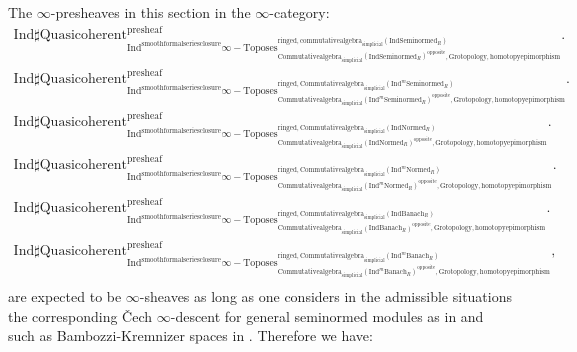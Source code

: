\documentclass[11pt]{book}
\theoremstyle{definition}
\numberwithin{equation}{section}
\begin{document}
\indent The $\infty$-presheaves in this section in the $\infty$-category:	
\begin{align}
\mathrm{Ind}\mathrm{\sharp Quasicoherent}^{\text{presheaf}}_{\mathrm{Ind}^\text{smoothformalseriesclosure}\infty-\mathrm{Toposes}^{\mathrm{ringed},\mathrm{commutativealgebra}_{\mathrm{simplicial}}(\mathrm{Ind}\mathrm{Seminormed}_R)}_{\mathrm{Commutativealgebra}_{\mathrm{simplicial}}(\mathrm{Ind}\mathrm{Seminormed}_R)^\mathrm{opposite},\mathrm{Grotopology,homotopyepimorphism}}}. \\
\mathrm{Ind}\mathrm{\sharp Quasicoherent}^{\text{presheaf}}_{\mathrm{Ind}^\text{smoothformalseriesclosure}\infty-\mathrm{Toposes}^{\mathrm{ringed},\mathrm{Commutativealgebra}_{\mathrm{simplicial}}(\mathrm{Ind}^m\mathrm{Seminormed}_R)}_{\mathrm{Commutativealgebra}_{\mathrm{simplicial}}(\mathrm{Ind}^m\mathrm{Seminormed}_R)^\mathrm{opposite},\mathrm{Grotopology,homotopyepimorphism}}}.\\
\mathrm{Ind}\mathrm{\sharp Quasicoherent}^{\text{presheaf}}_{\mathrm{Ind}^\text{smoothformalseriesclosure}\infty-\mathrm{Toposes}^{\mathrm{ringed},\mathrm{Commutativealgebra}_{\mathrm{simplicial}}(\mathrm{Ind}\mathrm{Normed}_R)}_{\mathrm{Commutativealgebra}_{\mathrm{simplicial}}(\mathrm{Ind}\mathrm{Normed}_R)^\mathrm{opposite},\mathrm{Grotopology,homotopyepimorphism}}}.\\
\mathrm{Ind}\mathrm{\sharp Quasicoherent}^{\text{presheaf}}_{\mathrm{Ind}^\text{smoothformalseriesclosure}\infty-\mathrm{Toposes}^{\mathrm{ringed},\mathrm{Commutativealgebra}_{\mathrm{simplicial}}(\mathrm{Ind}^m\mathrm{Normed}_R)}_{\mathrm{Commutativealgebra}_{\mathrm{simplicial}}(\mathrm{Ind}^m\mathrm{Normed}_R)^\mathrm{opposite},\mathrm{Grotopology,homotopyepimorphism}}}.\\
\mathrm{Ind}\mathrm{\sharp Quasicoherent}^{\text{presheaf}}_{\mathrm{Ind}^\text{smoothformalseriesclosure}\infty-\mathrm{Toposes}^{\mathrm{ringed},\mathrm{Commutativealgebra}_{\mathrm{simplicial}}(\mathrm{Ind}\mathrm{Banach}_R)}_{\mathrm{Commutativealgebra}_{\mathrm{simplicial}}(\mathrm{Ind}\mathrm{Banach}_R)^\mathrm{opposite},\mathrm{Grotopology,homotopyepimorphism}}}.\\
\mathrm{Ind}\mathrm{\sharp Quasicoherent}^{\text{presheaf}}_{\mathrm{Ind}^\text{smoothformalseriesclosure}\infty-\mathrm{Toposes}^{\mathrm{ringed},\mathrm{Commutativealgebra}_{\mathrm{simplicial}}(\mathrm{Ind}^m\mathrm{Banach}_R)}_{\mathrm{Commutativealgebra}_{\mathrm{simplicial}}(\mathrm{Ind}^m\mathrm{Banach}_R)^\mathrm{opposite},\mathrm{Grotopology,homotopyepimorphism}}},\\
\end{align}
are expected to be $\infty$-sheaves as long as one considers in the admissible situations the corresponding \v{C}ech $\infty$-descent for general seminormed modules as in \cite[Section 9.3]{KKM} and \cite{12BBK} such as Bambozzi-Kremnizer spaces in \cite{12BK}. Therefore we have:\\ 
\end{document}
